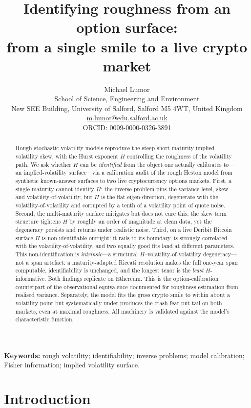 \documentclass[11pt,a4paper]{article}
\title{Identifying roughness from an option surface:\\ from a single smile to a live crypto market}
\author{Michael Lumor\\[3pt]
\small School of Science, Engineering and Environment\\
\small New SEE Building, University of Salford, Salford M5 4WT, United Kingdom\\
\small \href{mailto:m.lumor@edu.salford.ac.uk}{m.lumor@edu.salford.ac.uk}\\
\small ORCID: 0009-0000-0326-3891}
\date{}
\numberwithin{equation}{section}
\begin{document}
\maketitle

\begin{abstract}
Rough stochastic volatility models reproduce the steep short-maturity implied-volatility
skew, with the Hurst exponent $H$ controlling the roughness of the volatility path. We ask
whether $H$ can be \emph{identified} from the object one actually calibrates to---an
implied-volatility surface---via a calibration audit of the rough Heston model from
synthetic known-answer surfaces to two live cryptocurrency options markets. First, a
single maturity cannot identify $H$: the inverse problem pins the variance level, skew and
volatility-of-volatility, but $H$ is the flat eigen-direction, degenerate with the
volatility-of-volatility and corrupted by a tenth of a volatility point of quote noise.
Second, the multi-maturity surface mitigates but does not cure this: the skew term
structure tightens $H$ by roughly an order of magnitude at clean data, yet the degeneracy
persists and returns under realistic noise. Third, on a live Deribit Bitcoin surface $H$
is non-identifiable outright: it rails to its boundary, is strongly correlated with the
volatility-of-volatility, and two equally good fits land at different parameters. This non-identification
is \emph{intrinsic}---a structural $H$--volatility-of-volatility degeneracy---not a span
artefact: a maturity-adapted Riccati resolution makes the full one-year span computable,
identifiability is unchanged, and the longest tenor is the \emph{least} $H$-informative.
Both findings replicate on Ethereum. This is the option-calibration counterpart of the
observational equivalence documented for roughness estimation from realised variance.
Separately, the model fits the gross crypto smile to within about a volatility point but
systematically under-produces the crash-fear put tail on both markets, even at maximal
roughness. All machinery is validated against the model's characteristic function.
\end{abstract}

\noindent\textbf{Keywords:} rough volatility; identifiability; inverse problems; model calibration; Fisher information; implied volatility surface.

\medskip


\section{Introduction}\label{sec:intro}
\end{document}
